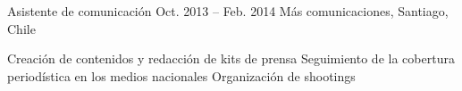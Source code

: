 \begin{joblist}
{		%
	}



\item[Asistente de comunicación]{Oct. 2013 -- Feb. 2014 }     
  	{Más comunicaciones, Santiago, Chile}     
  	{

		\iftbftiny \vspace{-0.5cm} \fi
		\begin{itemize}
			  \iftbftiny \setlength\itemsep{-3pt} \fi
			  \cvitem[\checkmark]  Creación de contenidos y redacción de kits de prensa                                       
			  \cvitem[\checkmark]  Seguimiento de la cobertura periodística en los medios nacionales                                          
			  \cvitem[\checkmark]  Organización de shootings

		\end{itemize}       
	}



   

\end{joblist}


%
%



